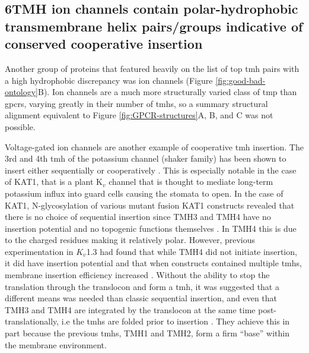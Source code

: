 \subsection{6TMH ion channels contain polar-hydrophobic transmembrane helix pairs/groups indicative of conserved cooperative insertion}

Another group of proteins that featured heavily on the list of top \gls{tmh} pairs with a high hydrophobic discrepancy was ion channels (Figure \ref{fig:good-bad-ontology}B).
Ion channels are a much more structurally varied class of \gls{tmp} than \gls{gpcr}s, varying greatly in their number of \gls{tmh}s, so a summary structural alignment equivalent to Figure \ref{fig:GPCR-structures}A, B, and C was not possible.

Voltage\--gated ion channels are another example of cooperative \gls{tmh} insertion.
The 3rd and 4th \gls{tmh} of the potassium channel (shaker family) has been shown to insert either sequentially or cooperatively \cite{Zhang2007, Cymer2015}.
This is especially notable in the case of KAT1, that is a plant K$_v$ channel that is thought to mediate long-term potassium influx into guard cells causing the stomata to open.
In the case of KAT1, N\--glycosylation of various mutant fusion KAT1 constructs revealed that there is no choice of sequential insertion since TMH3 and TMH4 have no insertion potential and no topogenic functions themselves \cite{Sato2002, Sato2003}.
In TMH4 this is due to the charged residues making it relatively polar.
However, previous experimentation in $K_{v}$1.3 had found that while TMH4 did not initiate insertion, it did have insertion potential and that when constructs contained multiple \gls{tmh}s, membrane insertion efficiency increased \cite{Tu2000}.
Without the ability to stop the translation through the translocon and form a \gls{tmh}, it was suggested that a different means was needed than classic sequential insertion, and even that TMH3 and TMH4 are integrated by the translocon at the same time post-translationally, i.e the \gls{tmh}s are folded prior to insertion \cite{Sato2003}.
They achieve this in part because the previous \gls{tmh}s,  TMH1 and TMH2, form a firm ``base'' within the membrane environment.

